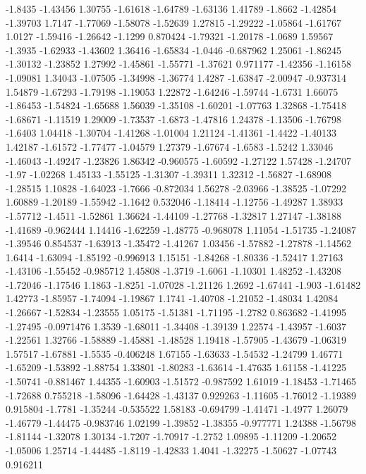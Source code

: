 \documentclass[9pt]{article}
\theoremstyle{plain}
\theoremstyle{definition}
\theoremstyle{remark}
\numberwithin{equation}{section}
\begin{document}
-1.8435
-1.43456
1.30755
-1.61618
-1.64789
-1.63136
1.41789
-1.8662
-1.42854
-1.39703
1.7147
-1.77069
-1.58078
-1.52639
1.27815
-1.29222
-1.05864
-1.61767
1.0127
-1.59416
-1.26642
-1.1299
0.870424
-1.79321
-1.20178
-1.0689
1.59567
-1.3935
-1.62933
-1.43602
1.36416
-1.65834
-1.0446
-0.687962
1.25061
-1.86245
-1.30132
-1.23852
1.27992
-1.45861
-1.55771
-1.37621
0.971177
-1.42356
-1.16158
-1.09081
1.34043
-1.07505
-1.34998
-1.36774
1.4287
-1.63847
-2.00947
-0.937314
1.54879
-1.67293
-1.79198
-1.19053
1.22872
-1.64246
-1.59744
-1.6731
1.66075
-1.86453
-1.54824
-1.65688
1.56039
-1.35108
-1.60201
-1.07763
1.32868
-1.75418
-1.68671
-1.11519
1.29009
-1.73537
-1.6873
-1.47816
1.24378
-1.13506
-1.76798
-1.6403
1.04418
-1.30704
-1.41268
-1.01004
1.21124
-1.41361
-1.4422
-1.40133
1.42187
-1.61572
-1.77477
-1.04579
1.27379
-1.67674
-1.6583
-1.5242
1.33046
-1.46043
-1.49247
-1.23826
1.86342
-0.960575
-1.60592
-1.27122
1.57428
-1.24707
-1.97
-1.02268
1.45133
-1.55125
-1.31307
-1.39311
1.32312
-1.56827
-1.68908
-1.28515
1.10828
-1.64023
-1.7666
-0.872034
1.56278
-2.03966
-1.38525
-1.07292
1.60889
-1.20189
-1.55942
-1.1642
0.532046
-1.18414
-1.12756
-1.49287
1.38933
-1.57712
-1.4511
-1.52861
1.36624
-1.44109
-1.27768
-1.32817
1.27147
-1.38188
-1.41689
-0.962444
1.14416
-1.62259
-1.48775
-0.968078
1.11054
-1.51735
-1.24087
-1.39546
0.854537
-1.63913
-1.35472
-1.41267
1.03456
-1.57882
-1.27878
-1.14562
1.6414
-1.63094
-1.85192
-0.996913
1.15151
-1.84268
-1.80336
-1.52417
1.27163
-1.43106
-1.55452
-0.985712
1.45808
-1.3719
-1.6061
-1.10301
1.48252
-1.43208
-1.72046
-1.17546
1.1863
-1.8251
-1.07028
-1.21126
1.2692
-1.67441
-1.903
-1.61482
1.42773
-1.85957
-1.74094
-1.19867
1.1741
-1.40708
-1.21052
-1.48034
1.42084
-1.26667
-1.52834
-1.23555
1.05175
-1.51381
-1.71195
-1.2782
0.863682
-1.41995
-1.27495
-0.0971476
1.3539
-1.68011
-1.34408
-1.39139
1.22574
-1.43957
-1.6037
-1.22561
1.32766
-1.58889
-1.45881
-1.48528
1.19418
-1.57905
-1.43679
-1.06319
1.57517
-1.67881
-1.5535
-0.406248
1.67155
-1.63633
-1.54532
-1.24799
1.46771
-1.65209
-1.53892
-1.88754
1.33801
-1.80283
-1.63614
-1.47635
1.61158
-1.41225
-1.50741
-0.881467
1.44355
-1.60903
-1.51572
-0.987592
1.61019
-1.18453
-1.71465
-1.72688
0.755218
-1.58096
-1.64428
-1.43137
0.929263
-1.11605
-1.76012
-1.19389
0.915804
-1.7781
-1.35244
-0.535522
1.58183
-0.694799
-1.41471
-1.4977
1.26079
-1.46779
-1.44475
-0.983746
1.02199
-1.39852
-1.38355
-0.977771
1.24388
-1.56798
-1.81144
-1.32078
1.30134
-1.7207
-1.70917
-1.2752
1.09895
-1.11209
-1.20652
-1.05006
1.25714
-1.44485
-1.8119
-1.42833
1.4041
-1.32275
-1.50627
-1.07743
0.916211
\end{document}
